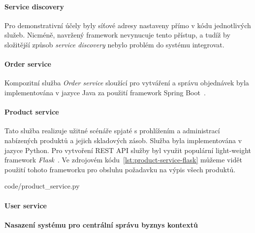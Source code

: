 \paragraph{Service discovery}

Pro demonstrativní účely byly síťové adresy nastaveny přímo v kódu jednotlivých
služeb. Nicméně, navržený framework nevynucuje tento přístup, a tudíž by složitější
způsob \textit{service discovery} nebylo problém do systému integrovat.

\paragraph{Order service}

Kompozitní služba \textit{Order service} sloužící pro vytváření a správu objednávek
byla implementována v jazyce Java za použití framework Spring Boot~\cite{springboot}.


\paragraph{Product service}

Tato služba realizuje užitné scénáře spjaté s prohlížením a administrací nabízených
produktů a jejich skladových zásob. Služba byla implementována v jazyce Python.
Pro vytvoření \gls{REST} \gls{API} služby byl využit populární light-weight framework \textit{Flask}~\cite{flask}.
Ve zdrojovém kódu~\ref{lst:product-service-flask} můžeme vidět použití tohoto frameworku pro obsluhu
požadavku na výpis všech produktů.



{code/product_service.py}

\paragraph{User service}


\paragraph{Nasazení systému pro centrální správu byznys kontextů}


